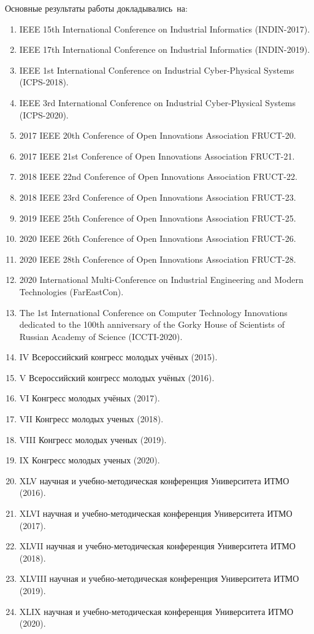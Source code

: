 {\probation}
Основные результаты работы докладывались~на:
\begin{enumerate}[beginpenalty=10000]
	\item IEEE 15th International Conference on Industrial Informatics (INDIN-2017).
	\item IEEE 17th International Conference on Industrial Informatics (INDIN-2019).
	\item IEEE 1st International Conference on Industrial Cyber-Physical Systems (ICPS-2018).
	\item IEEE 3rd International Conference on Industrial Cyber-Physical Systems (ICPS-2020).
	\item 2017 IEEE 20th Conference of Open Innovations Association {FRUCT-20}.
	\item 2017 IEEE 21st Conference of Open Innovations Association {FRUCT-21}.
	\item 2018 IEEE 22nd Conference of Open Innovations Association {FRUCT-22}.
	\item 2018 IEEE 23rd Conference of Open Innovations Association {FRUCT-23}.
	\item 2019 IEEE 25th Conference of Open Innovations Association {FRUCT-25}.
	\item 2020 IEEE 26th Conference of Open Innovations Association {FRUCT-26}.
	\item 2020 IEEE 28th Conference of Open Innovations Association {FRUCT-28}.
	\item 2020 International Multi-Conference on Industrial Engineering and Modern Technologies (FarEastCon).
	\item The 1st International Conference on Computer Technology Innovations dedicated to the 100th anniversary of the Gorky House of Scientists of Russian Academy of Science (ICCTI-2020).
	\item IV Всероссийский конгресс молодых учёных (2015).
	\item V Всероссийский конгресс молодых учёных (2016).
	\item VI Конгресс молодых учёных (2017).
	\item VII Конгресс молодых ученых (2018).
	\item VIII Конгресс молодых ученых (2019).
	\item IX Конгресс молодых ученых (2020).
	\item XLV научная и учебно-методическая конференция Университета \mbox{ИТМО} (2016).
	\item XLVI научная и учебно-методическая конференция Университета \mbox{ИТМО} (2017).
	\item XLVII научная и учебно-методическая конференция Университета \mbox{ИТМО} (2018).
	\item XLVIII научная и учебно-методическая конференция Университета \mbox{ИТМО} (2019).
	\item XLIX научная и учебно-методическая конференция Университета \mbox{ИТМО} (2020).
\end{enumerate}

